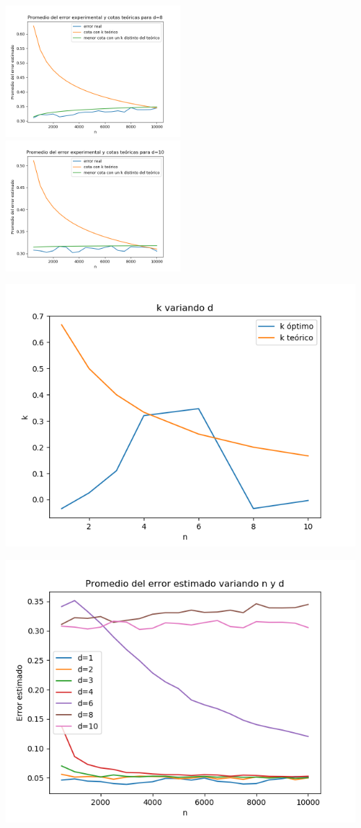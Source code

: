 \documentclass[12pt, a4paper]{article}
\begin{document}
\includegraphics[width=0.5\textwidth]{figuras_h=0.5/cotas-error-d=8}
\includegraphics[width=0.5\textwidth]{figuras_h=0.5/cotas-error-d=10}

\includegraphics[width=\textwidth]{figuras_h=0.5/k-variando-d}

\includegraphics[width=\textwidth]{figuras_h=0.5/resultados-grales}
\end{document}
